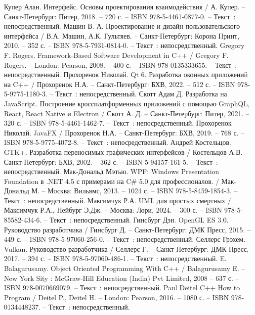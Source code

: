 
\begin{thebibliography}{23}
	 Купер Алан. Интерфейс. Основы проектирования взаимодействия / А. Купер. – Санкт-Петербург: Питер, 2018. – 720 с. – ISBN 978-5-4461-0877-0. – Текст~: непосредственный.
	 Машин В. А. Проектирование и дизайн пользовательского интерфейса / В.А. Машин, А.К. Гультяев. – Санкт-Петербург: Корона Принт, 2010. – 352 с. – ISBN 978-5-7931-0814-0. – Текст~: непосредственный.
	 Gregory F. Rogers. Framework-Based Software Development in C++  / Gregory F. Rogers. – London: Pearson, 2008. – 400 с. – ISBN 978-0135333655. – Текст~: непосредственный.
	 Прохоренок Николай. Qt 6. Разработка оконных приложений на C++ / Прохоренок Н.А. – Санкт-Петербург: БХВ, 2022. – 512 с. – ISBN 978-5-9775-1180-3. – Текст~: непосредственный.
	 Скотт Адам Д. Разработка на JavaScript. Построение кроссплатформенных приложений с помощью GraphQL, React, React Native и Electron / Скотт А. Д. – Санкт-Петербург: Питер, 2021. – 320 с. – ISBN 978-5-4461-1462-7. – Текст~: непосредственный.
	 Прохоренок Николай. JavaFX / Прохоренок Н.А. – Санкт-Петербург: БХВ, 2019. – 768 с. – ISBN 978-5-9775-4072-8. – Текст~: непосредственный.
	 Андрей Костельцов. GTK+. Разработка переносимых графических интерфейсов / Костельцов А.В. – Санкт-Петербург: БХВ, 2002. – 362 с. – ISBN 5-94157-161-5. – Текст~: непосредственный.
	 Мак-Дональд Мэтью. WPF: Windows Presentation Foundation в .NET 4.5 с примерами на C{\#} 5.0 для профессионалов. / Мак-Дональд М. – Москва: Вильямс, 2013. – 1024 с. – ISBN 978-5-8459-1854-3. – Текст~: непосредственный.
	 Максимчук Р.А. UML для простых смертных /Максимчук  Р.А., Нейбург Э.Дж. – Москва: Лори, 2024. – 300 с. – ISBN 978-5-85582-434-6. – Текст~: непосредственный.
	 Гинсбург Дэн. OpenGL ES 3.0. Руководство разработчика / Гинсбург Д. – Санкт-Петербург: ДМК Пресс, 2015. – 449 с. – ISBN 978-5-97060-256-0. – Текст~: непосредственный.
	 Селлерс Грэхем. Vulkan. Руководство разработчика / Селлерс Г. – Санкт-Петербург: ДМК Пресс, 2017. – 394 с. – ISBN 978-5-97060-486-1. – Текст~: непосредственный.
     E. Balagurusamy. Object Oriented Programming With C++ / Balagurusamy E.  – New York Sity : McGraw-Hill Education (India) Pvt Limited, 2008 – 637 с. – ISBN 978-0070669079. – Текст~: непосредственный.
     Paul Deitel C++ How to Program / Deitel P., Deitel H. – London: Pearson, 2016. – 1080 с. – ISBN 978-0134448237. – Текст~: непосредственный.

\end{thebibliography}
